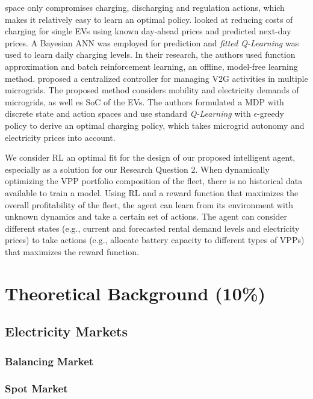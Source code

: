 \documentclass[12pt, article]{article}
\begin{document}
space only compromises charging, discharging and regulation actions, which makes
it relatively easy to learn an optimal policy.
\textcite{chis16_reinf_learn_based_plug_in} looked at reducing costs of charging
for single EVs using known day-ahead prices and predicted next-day prices. A
Bayesian ANN was employed for prediction and \emph{fitted Q-Learning} was used to
learn daily charging levels. In their research, the authors used function
approximation and batch reinforcement learning, an offline, model-free learning
method. \textcite{ko18_mobil_aware_vehic_to_grid} proposed a centralized
controller for managing V2G activities in multiple microgrids. The proposed
method considers mobility and electricity demands of microgrids, as well es SoC
of the EVs. The authors formulated a MDP with discrete state and action spaces
and use standard \emph{Q-Learning} with \(\epsilon\)-greedy policy to derive an optimal
charging policy, which takes microgrid autonomy and electricity prices into
account.


\parencite{vazquez-canteli19_reinf_learn_deman_respon}

We consider RL an optimal fit for the design of our proposed intelligent agent,
especially as a solution for our Research Question 2. When dynamically
optimizing the VPP portfolio composition of the fleet, there is no historical
data available to train a model. Using RL and a reward function that maximizes
the overall profitability of the fleet, the agent can learn from its environment
with unknown dynamics and take a certain set of actions. The agent can consider
different states (e.g., current and forecasted rental demand levels and
electricity prices) to take actions (e.g., allocate battery capacity to
different types of VPPs) that maximizes the reward function.


\section{Theoretical Background (10\%)}
\label{sec:org4b5116d}
\subsection{Electricity Markets}
\label{sec:org994572c}
\subsubsection{Balancing Market}
\label{sec:org36e8ff0}
\subsubsection{Spot Market}
\label{sec:org1e57bc2}
\end{document}

